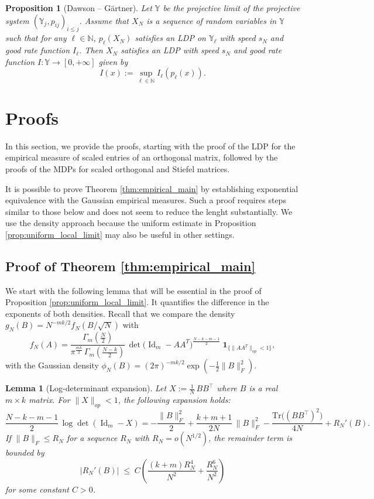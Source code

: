 \documentclass[11pt,a4paper,twoside]{article}
\newtheorem{lemma}[thm]{Lemma}
\newtheorem{proposition}[thm]{Proposition}
\theoremstyle{definition}
\begin{document}
\begin{proposition}[Dawson -- G\"artner]\label{prop:B:dawson-gaertner}
		Let $\mathbb{Y}$ be the projective limit of the projective system $\left(\mathbb{Y}_j, p_{i j}\right)_{i \leq j}$. Assume that $X_N$ is a sequence of random variables in $\mathbb{Y}$ such that for any $\ell \in \mathbb{N}$, $p_{\ell}(X_N)$ satisfies an LDP on $\mathbb{Y}_{\ell}$ with speed $s_N$ and good rate function $I_{\ell}$. Then $X_N$ satisfies an LDP with speed $s_N$ and good rate function $I: \mathbb{Y} \rightarrow[0,+\infty]$ given by
		$$
		I(x):=\sup _{\ell \in \mathbb{N}} I_{\ell}\left(p_{\ell}(x)\right) .
		$$
	\end{proposition}

\section{Proofs}
\label{C:sec:proofs}\label{sec:proofs}


In this section, we provide the proofs, starting with the proof of the LDP for the empirical measure of scaled entries of an orthogonal matrix, followed by the proofs of the MDPs for scaled orthogonal and Stiefel matrices.

It is possible to prove Theorem \ref{thm:empirical_main} by establishing exponential equivalence with the Gaussian empirical measures. Such a proof requires steps similar to those below and does not seem to reduce the lenght substantially. We use the density approach because the uniform estimate in Proposition \ref{prop:uniform_local_limit} may also be useful in other settings.

	\subsection{Proof of Theorem \ref{thm:empirical_main}}
	We start with the following lemma that will be essential in the proof of Proposition \ref{prop:uniform_local_limit}. It quantifies the difference in the exponents of both densities. Recall that we compare the density $g_N(B)=N^{-mk/2}f_N(B/\sqrt{N})$ with
\[
  f_N(A)=\frac{\Gamma_m\left(\frac{N}{2}\right)}{\pi^{\frac{mk}{2}}\,\Gamma_m\left(\frac{N-k}{2}\right)}\,\det\bigl(\operatorname{Id}_m-AA^T\bigr)^{\frac{N-k-m-1}{2}}\;\mathbf 1_{\{\|AA^T\|_{op}<1\}},
\]
	with the Gaussian density $\phi_N(B)=(2\pi)^{-mk/2}\exp(-\frac12\|B\|_F^2)$.

\begin{lemma}[Log-determinant expansion]
	\label{lem:log_det_expansion}
	Let \(X := \frac1N\,B B^\top\) where $B$ is a real $m\times k$ matrix. For \(\|X\|_{op}<1\), the following expansion holds:
	\[
	\frac{N-k-m-1}{2}\,\log\det(\operatorname{Id}_m - X)
	= -\frac{\|B\|_F^2}{2}
	  + \frac{k+m+1}{2N}\,\|B\|_F^2
	  - \frac{\mathrm{Tr}\bigl((BB^\top)^2\bigr)}{4N}
	  + R_N'(B).
	\]
	If \(\|B\|_F \le R_N\) for a sequence $R_N$ with \(R_N = o(N^{1/2})\), the remainder term is bounded by
	\[
	|R_N'(B)| \;\le\; C \left( \frac{(k+m)R_N^4}{N^2} + \frac{R_N^6}{N^2} \right)
	\]
	for some constant $C>0$.
\end{lemma}
\end{document}
